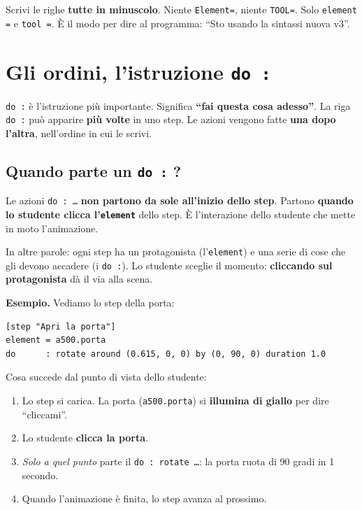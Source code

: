 ﻿\documentclass[a4paper,12pt,oneside]{book}
\newcommand{\kw}[1]{\texttt{\color{keycolor}#1}}
\begin{document}
\begin{regola}
Scrivi le righe \textbf{tutte in minuscolo}. Niente \texttt{Element=}, niente
\texttt{TOOL=}. Solo \texttt{element =} e \texttt{tool =}. È il modo per dire al
programma: ``Sto usando la sintassi nuova v3''.
\end{regola}

\chapter{Gli ordini, l'istruzione \texttt{do :}}
\label{ch:do}

\kw{do :} è l'istruzione più importante. Significa \textbf{``fai questa cosa
adesso''}. La riga \kw{do :} può apparire \textbf{più volte} in uno step. Le
azioni vengono fatte \textbf{una dopo l'altra}, nell'ordine in cui le scrivi.

\section{Quando parte un \texttt{do :} ?}

\begin{regola}
Le azioni \kw{do : \ldots} \textbf{non partono da sole all'inizio dello step}.
Partono \textbf{quando lo studente clicca l'\kw{element}} dello step. È
l'interazione dello studente che mette in moto l'animazione.
\end{regola}

In altre parole: ogni step ha un protagonista (l'\kw{element}) e una serie di
cose che gli devono accadere (i \kw{do :}). Lo studente sceglie il momento:
\textbf{cliccando sul protagonista} dà il via alla scena.

\textbf{Esempio.} Vediamo lo step della porta:

\begin{lstlisting}
[step "Apri la porta"]
element = a500.porta
do      : rotate around (0.615, 0, 0) by (0, 90, 0) duration 1.0
\end{lstlisting}

Cosa succede dal punto di vista dello studente:

\begin{enumerate}
  \item Lo step si carica. La porta (\texttt{a500.porta}) si \textbf{illumina
        di giallo} per dire ``cliccami''.
  \item Lo studente \textbf{clicca la porta}.
  \item \emph{Solo a quel punto} parte il \kw{do : rotate \ldots}: la porta
        ruota di 90 gradi in 1 secondo.
  \item Quando l'animazione è finita, lo step avanza al prossimo.
\end{enumerate}
\end{document}
